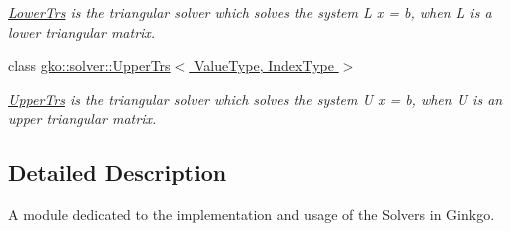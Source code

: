 \begin{DoxyCompactItemize}
\begin{DoxyCompactList}\small\item\em \hyperlink{classgko_1_1solver_1_1LowerTrs}{Lower\+Trs} is the triangular solver which solves the system L x = b, when L is a lower triangular matrix. \end{DoxyCompactList}\item 
class \hyperlink{classgko_1_1solver_1_1UpperTrs}{gko\+::solver\+::\+Upper\+Trs$<$ Value\+Type, Index\+Type $>$}
\begin{DoxyCompactList}\small\item\em \hyperlink{classgko_1_1solver_1_1UpperTrs}{Upper\+Trs} is the triangular solver which solves the system U x = b, when U is an upper triangular matrix. \end{DoxyCompactList}\end{DoxyCompactItemize}


\subsection{Detailed Description}
A module dedicated to the implementation and usage of the Solvers in Ginkgo. 

